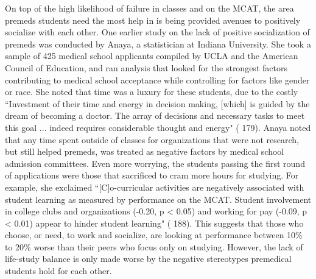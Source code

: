 \documentclass [12pt]{article}
\begin{document}
\begin{flushleft}
On top of the high likelihood of failure in classes and on the MCAT, the area premeds students need the most help in is being provided avenues to positively socialize with each other. One earlier study on the lack of positive socialization of premeds was conducted by Anaya, a statistician at Indiana University. She took a sample of 425 medical school applicants compiled by UCLA and the American Council of Education, and ran analysis that looked for the strongest factors contributing to medical school acceptance while controlling for factors like gender or race. She noted that time was a luxury for these students, due to the costly {``}Investment of their time and energy in decision making, [which] is guided by the dream of becoming a doctor. The array of decisions and necessary tasks to meet this goal ... indeed requires considerable thought and energy" (\cite{Anaya-2001} 179). Anaya noted that any time spent outside of classes for organizations that were not research, but still helped premeds, was treated as negative factors by medical school admission committees. Even more worrying, the students passing the first round of applications were those that sacrificed to cram more hours for studying. For example, she exclaimed {``}[C]o-curricular activities are negatively associated with student learning as measured by performance on the MCAT. Student involvement in college clubs and organizations (-0.20, p < 0.05) and working for pay (-0.09, p < 0.01) appear to hinder student learning" (\cite{Anaya-2001} 188). This suggests that those who choose, or need, to work and socialize, are looking at performance between 10\% to 20\% worse than their peers who focus only on studying. However, the lack of life-study balance is only made worse by the negative stereotypes premedical students hold for each other.
	

\end{flushleft}
\end{document}

